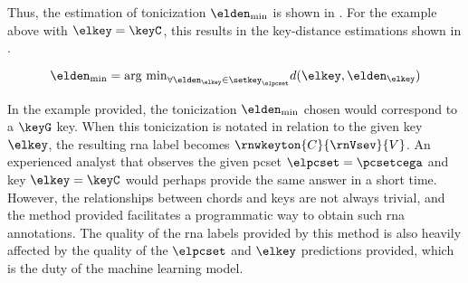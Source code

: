 
Thus, the estimation of tonicization $\elden_{\min}$ is
shown in . For the example
above with $\elkey = \keyC$, this results in the
key-distance estimations shown in
.

\begin{equation}
    \label{eq:tonicization_estimation}
    \elden_{\min} = \text{arg min}_{\forall \elden_\elkey \in \setkey_\elpcset} d(\elkey, \elden_\elkey)
\end{equation}


In the example provided, the tonicization $\elden_{\min}$
chosen would correspond to a $\keyG$ key. When this
tonicization is notated in relation to the given key
$\elkey$, the resulting \gls{rna} label becomes
$\rnwkeyton{C}{\rnVsev}{V}$. An experienced analyst that
observes the given \gls{pcset} $\elpcset = \pcsetcega$ and
key $\elkey = \keyC$ would perhaps provide the same answer
in a short time. 
However, the relationships between chords and keys are not
always trivial, and the method provided facilitates a
programmatic way to obtain such \gls{rna} annotations. The
quality of the \gls{rna} labels provided by this method is
also heavily affected by the quality of the $\elpcset$ and
$\elkey$ predictions provided, which is the duty of the
machine learning model.
